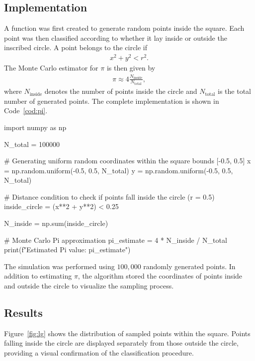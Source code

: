 \documentclass[../portafolio.tex]{subfiles}
\begin{document}
\subsection{Implementation}

A function was first created to generate random points inside the square. Each point was then classified according to whether it lay inside or outside the inscribed circle. A point belongs to the circle if
\begin{align*}
x^2+y^2 < r^2.
\end{align*}
The Monte Carlo estimator for $\pi$ is then given by
\begin{align*}
\pi \approx 4 \frac{N_{\text{inside}}}{N_{\text{total}}},
\end{align*}
where $N_{\text{inside}}$ denotes the number of points inside the circle and $N_{\text{total}}$ is the total number of generated points. The complete implementation is shown in Code~\ref{cod:pi}.

\begin{listing}
\begin{pythoncode}
import numpy as np

N_total = 100000

# Generating uniform random coordinates within the square bounds [-0.5, 0.5]
x = np.random.uniform(-0.5, 0.5, N_total)
y = np.random.uniform(-0.5, 0.5, N_total)

# Distance condition to check if points fall inside the circle (r = 0.5)
inside_circle = (x**2 + y**2) < 0.25

N_inside = np.sum(inside_circle)

# Monte Carlo Pi approximation
pi_estimate = 4 * N_inside / N_total
print(f"Estimated Pi value: {pi_estimate}")
\end{pythoncode}
\caption{Monte Carlo estimation of $\pi$.}
\label{cod:pi}
\end{listing}

The simulation was performed using $100,000$ randomly generated points. In addition to estimating $\pi$, the algorithm stored the coordinates of points inside and outside the circle to visualize the sampling process.

\subsection{Results}

Figure~\ref{fig:lg} shows the distribution of sampled points within the square. Points falling inside the circle are displayed separately from those outside the circle, providing a visual confirmation of the classification procedure.
\end{document}
